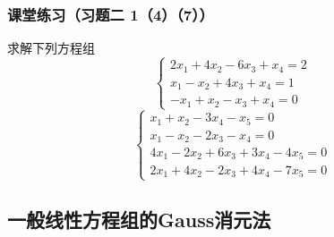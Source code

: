 \begin{frame}\frametitle{课堂练习（习题二 1（4）（7））}


\begin{example} 求解下列方程组
\[\left\{\begin{array}{l}
2x_1 + 4x_2 - 6x_3 + x_4 = 2 \\
x_1 - x_2 + 4x_3 + x_4 = 1 \\
- x_1 + x_2 - x_3 + x_4 = 0
\end{array}\right.\]
\pp
\[\left\{\begin{array}{l}
x_1 + x_2 - 3x_4 - x_5 = 0 \\
x_1 - x_2 - 2x_3 - x_4 = 0 \\
4x_1 - 2x_2 + 6x_3 + 3x_4 - 4x_5 = 0 \\
2x_1 + 4x_2 - 2x_3 + 4x_4 - 7x_5 = 0
\end{array}\right.\]
\end{example}

\end{frame}


\renewcommand{\mydate}{2025年3月4号 第三次课}
\subsection{一般线性方程组的Gauss消元法}





